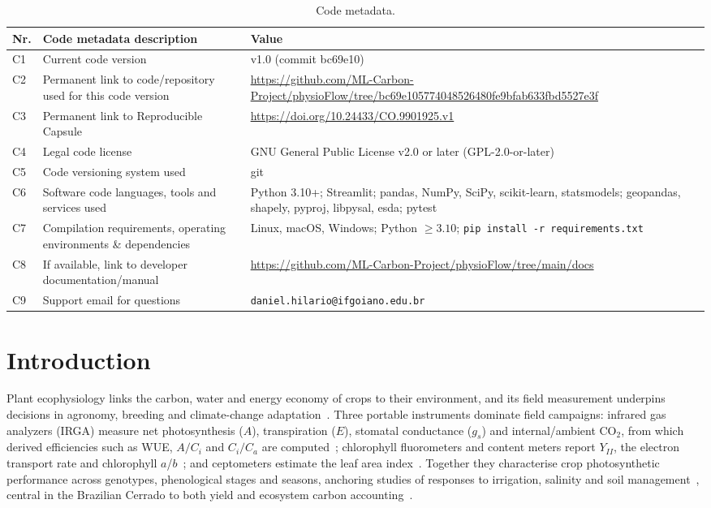 \documentclass[11pt, letterpaper]{article}
\begin{document}
\begin{table}[H]
\centering
\footnotesize
\begin{tabular}{|l|p{4.7cm}|p{6.3cm}|}
\hline
\textbf{Nr.} & \textbf{Code metadata description} & \textbf{Value} \\
\hline
C1 & Current code version & v1.0 (commit bc69e10) \\
\hline
C2 & Permanent link to code/repository used for this code version & \url{https://github.com/ML-Carbon-Project/physioFlow/tree/bc69e105774048526480fe9bfab633fbd5527e3f} \\
\hline
C3 & Permanent link to Reproducible Capsule & \url{https://doi.org/10.24433/CO.9901925.v1} \\
\hline
C4 & Legal code license & GNU General Public License v2.0 or later (GPL-2.0-or-later) \\
\hline
C5 & Code versioning system used & git \\
\hline
C6 & Software code languages, tools and services used & Python 3.10+; Streamlit; pandas, NumPy, SciPy, scikit-learn, statsmodels; geopandas, shapely, pyproj, libpysal, esda; pytest \\
\hline
C7 & Compilation requirements, operating environments \& dependencies & Linux, macOS, Windows; Python $\geq 3.10$; \texttt{pip install -r requirements.txt} \\
\hline
C8 & If available, link to developer documentation/manual & \url{https://github.com/ML-Carbon-Project/physioFlow/tree/main/docs} \\
\hline
C9 & Support email for questions & \texttt{daniel.hilario@ifgoiano.edu.br} \\
\hline
\end{tabular}
\caption{Code metadata.}
\label{tbl:metadata}
\end{table}

\section{Introduction}\label{sec:intro}

Plant ecophysiology links the carbon, water and energy economy of crops to their environment, and its field measurement underpins decisions in agronomy, breeding and climate-change adaptation~\cite{Lambers2008,Long2006}. Three portable instruments dominate field campaigns: infrared gas analyzers (IRGA) measure net photosynthesis ($A$), transpiration ($E$), stomatal conductance ($g_s$) and internal/ambient CO$_2$, from which derived efficiencies such as WUE, $A/C_i$ and $C_i/C_a$ are computed~\cite{Farquhar1980,vonCaemmerer2000,Long2003}; chlorophyll fluorometers and content meters report $Y_{II}$, the electron transport rate and chlorophyll $a$/$b$~\cite{Maxwell2000,Baker2008}; and ceptometers estimate the leaf area index~\cite{Breda2003}. Together they characterise crop photosynthetic performance across genotypes, phenological stages and seasons, anchoring studies of responses to irrigation, salinity and soil management~\cite{Oliveira2017,Munjonji2021,Peters2012,Sanchez2003,Guarrera2024}, central in the Brazilian Cerrado to both yield and ecosystem carbon accounting~\cite{Vourlitis2022}.
\end{document}
